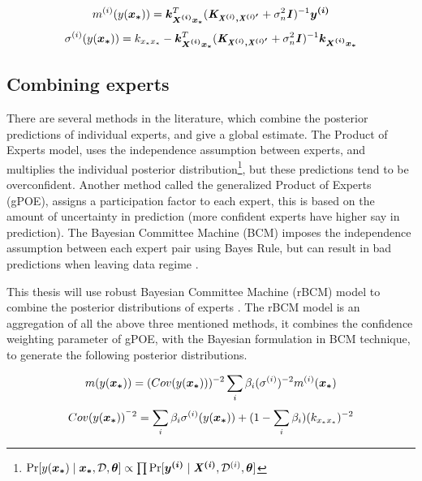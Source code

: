 \begin{equation}\label{eqPredictiveMeanIndividualExpert}
  m^{(i)}(y(\boldsymbol{x_{*}})) = \boldsymbol{k_{X^{(i)}x_{*}}}^{T}( \bm{\mathit{K_{X^{(i)}, X^{(i)'}}}} + \sigma^{2}_{n}\bm{\mathit{I}})^{-1} \boldsymbol{y^{(i)}}
  \end{equation}
\begin{equation}\label{eqPredictiveCovarianceIndividualExpert}
	\sigma^{(i)}(y(\boldsymbol{x_{*}})) = k_{x_{*}x_{*}} - \boldsymbol{k_{X^{(i)}x_{*}}}^{T}( \bm{\mathit{K_{X^{(i)}, X^{(i)'}}}} + \sigma^{2}_{n}\bm{\mathit{I}} )^{-1} \boldsymbol{k_{X^{(i)}x_{*}}}
  \end{equation}

\subsection{Combining experts}\label{subSecCombiningExperts}
There are several methods in the literature, which combine the posterior predictions of individual experts, and give a global estimate. The Product of Experts model, uses the independence assumption between experts, and multiplies the individual posterior distribution\footnote{$\Pr[y(\boldsymbol{x_{*}}) \mid \boldsymbol{x_{*}}, \mathcal{D}, \boldsymbol{\theta}] \propto \prod \Pr[\boldsymbol{y^{(i)}} \mid \bm{\mathit{X^{(i)}}}, \mathcal{D}^{(i)}, \boldsymbol{\theta}]$}, but these predictions tend to be overconfident. Another method called the generalized Product of Experts (gPOE), assigns a participation factor to each expert, this is based on the amount of uncertainty in prediction (more confident experts have higher say in prediction)\cite{caoF14}. The Bayesian Committee Machine (BCM) imposes the independence assumption between each expert pair using Bayes Rule, but can result in bad predictions when leaving data regime \cite{tresp2000bayesian}. 

This thesis will use robust Bayesian Committee Machine (rBCM) model to combine the posterior distributions of experts \cite{deisenroth2015distributed}. The rBCM model is an aggregation of all the above three mentioned methods, it combines the confidence weighting parameter of gPOE, with the Bayesian formulation in BCM technique, to generate the following posterior distributions.

\begin{equation}\label{eqMeanDGP}
    m(y(\boldsymbol{x_{*}})) = (Cov(y(\boldsymbol{x_{*}})))^{-2}\sum_{i} \beta_{i}(\sigma^{(i)})^{-2}m^{(i)}(\boldsymbol{x_{*}})
\end{equation}
\begin{equation}\label{eqCovarianceDGP}
    Cov(y(\boldsymbol{x_{*}}))^{^-2} = \sum_{i} \beta_{i}\sigma^{(i)}(y(\boldsymbol{x_{*}})) + (1- \sum_{i} \beta_{i})(k_{x_{*}x_{*}})^{-2}
\end{equation}


